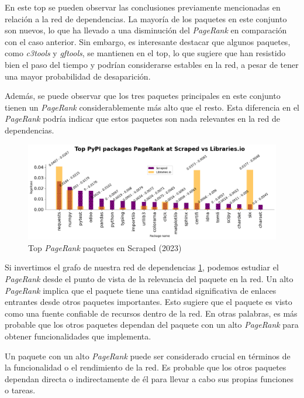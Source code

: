 En este top se pueden observar las conclusiones previamente mencionadas en relación a la red de
dependencias. La mayoría de los paquetes en este conjunto son nuevos, lo que ha llevado a una
disminución del \textit{PageRank} en comparación con el caso anterior. Sin embargo, es
interesante destacar que algunos paquetes, como \textit{c3tools} y
\textit{gftools},
se mantienen en el top, lo que sugiere que han resistido bien el paso del tiempo y podrían
considerarse estables en la red, a pesar de tener una mayor probabilidad de
desaparición.

Además, se puede observar que los tres paquetes principales en este conjunto tienen
un \textit{PageRank} considerablemente más alto que el resto. Esta diferencia en
el \textit{PageRank} podría indicar que estos paquetes son nada relevantes
en la red de dependencias.

\begin{figure}[ht!]
    \begin{center}
        \includegraphics[width=1\textwidth]{img/pypi/t20_pkg_pr_scr.png}
        \caption{Top \textit{PageRank} paquetes en Scraped (2023)}
        \label{fig:Top PageRank paquetes en Scraped}
    \end{center}
\end{figure}

Si invertimos el grafo de nuestra red de dependencias \ref{fig:Top PageRank paquetes en Scraped}, podemos estudiar el \textit{PageRank}
desde el punto de vista de la relevancia del paquete en la red. Un alto \textit{PageRank}
implica que el paquete tiene una cantidad significativa de enlaces entrantes desde otros paquetes
importantes. Esto sugiere que el paquete es visto como una fuente confiable de recursos dentro de la red.
En otras palabras, es más probable que los otros paquetes dependan del paquete con un alto \textit{PageRank} para obtener
funcionalidades que implementa.

Un paquete con un alto \textit{PageRank} puede ser considerado crucial en términos de la funcionalidad
o el rendimiento de la red. Es probable que los otros paquetes dependan directa o indirectamente de
él para llevar a cabo sus propias funciones o tareas.

